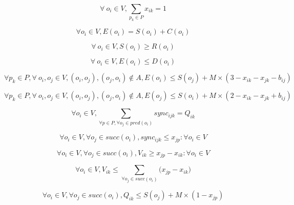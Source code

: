 \begin{equation}
\forall\ o_i \in V, \sum_{p_k \in P}x_{ik}=1
\label{schedRT:const_1}
\end{equation}

\begin{equation}
\forall o_i \in V, E(o_i) = S(o_i) + C(o_i)
\label{schedRT:const_2}
\end{equation}

\begin{equation}
\forall\ o_i \in V, S(o_i) \geq R(o_i)
\label{schedRT:const_01}
\end{equation}

\begin{equation}
\forall\ o_i \in V, E(o_i) \leq D(o_i)
\label{schedRT:const_02}
\end{equation}

\begin{equation}
\forall p_k \in P, \forall\ o_i, o_j \in V, (o_i,o_j), (o_j,o_i) \notin A, E(o_i) \leq S(o_j) + M \times (3 - x_{ik} - x_{jk} - b_{ij}) 
\label{schedRT:const_11}
\end{equation}

\begin{equation}
\forall p_k \in P, \forall\ o_i, o_j \in V, (o_i,o_j), (o_j,o_i) \notin A, E(o_j) \leq S(o_i) + M \times (2 - x_{ik} - x_{jk} + b_{ij}) 
\label{schedRT:const_12}
\end{equation}

\begin{equation}
\forall o_i \in V, \sum_{\forall p \in P, \forall o_j \in pred(o_i)}sync_{ijk}= Q_{ik}
\label{schedRT:const_3}
\end{equation}

\begin{equation}
\forall o_i \in V, \forall o_j \in succ(o_i), sync_{ijk} \leq x_{jp}: \forall o_i \in V
\label{schedRT:const_4}
\end{equation}

\begin{equation}
\forall o_i \in V, \forall o_j \in succ(o_i), V_{ik} \geq x_{jp} - x_{ik}: \forall o_i \in V
\label{schedRT:const_5}
\end{equation}

\begin{equation}
 \forall o_i \in V, V_{ik} \leq \sum_{\forall o_j \in succ(o_i)}\big(x_{jp} - x_{ik}\big)
\label{schedRT:const_6}
\end{equation}

\begin{equation}
\forall o_i \in V, \forall o_j \in succ(o_i), Q_{ik} \leq S(o_j) + M \times (1-x_{jp})
\label{schedRT:const_7}
\end{equation}

